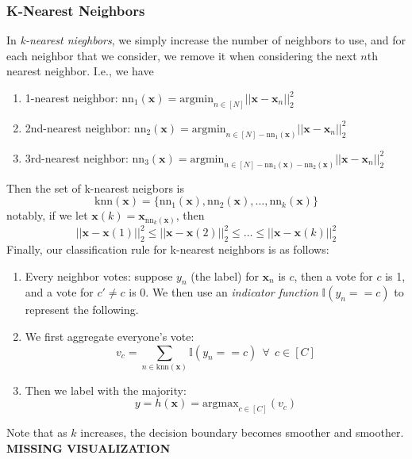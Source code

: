 \documentclass[11 pt]{scrartcl}
\newcommand{\vecx}{\textbf{x}}
\begin{document}
\subsubsection{K-Nearest Neighbors}
\begin{definition}
  In \emph{k-nearest nieghbors}, we simply increase the number of neighbors to use, and for each neighbor that we consider, we remove it when considering the next $n$th nearest neighbor. I.e., we have
\begin{center}
  \begin{enumerate}
    \item 1-nearest neighbor: $\text{nn}_1(\mathbf{x}) = \text{argmin}_{n \in [N]} ||\mathbf{x} - \mathbf{x}_n||_2^2$
    \item 2nd-nearest neighbor: $\text{nn}_2(\mathbf{x}) = \text{argmin}_{n \in [N] - \text{nn}_1(\mathbf{x})} ||\mathbf{x} - \mathbf{x}_n||_2^2$
    \item 3rd-nearest neighbor: $\text{nn}_3(\mathbf{x}) = \text{argmin}_{n \in [N] - \text{nn}_1(\mathbf{x}) - \text{nn}_2(\mathbf{x})} ||\mathbf{x} - \mathbf{x}_n||_2^2$   
  \end{enumerate}
\end{center}
Then the set of k-nearest neigbors is 
$$
\text{knn}(\textbf{x}) = \{\text{nn}_1(\textbf{x}), \text{nn}_2(\textbf{x}), \hdots , \text{nn}_k(\textbf{x})\}
$$
notably, if we let $\textbf{x}(k) = \textbf{x}_{\text{nn}_k(\textbf{x})}$, then
$$
||\vecx - \vecx(1)||_2^2 \leq ||\vecx - \vecx(2)||_2^2 \leq \hdots \leq ||\vecx - \vecx(k)||_2^2
$$
Finally, our classification rule for k-nearest neighbors is as follows:
\begin{center}
\begin{enumerate}
  \item Every neighbor votes: suppose $y_n$ (the label) for $\vecx_n$ is $c$, then a vote for $c$ is 1, and a vote for $c' \neq c$ is 0. We then use an \textit{indicator function} $\mathbb{I}(y_n == c)$ to represent the following.
  \item We first aggregate everyone's vote: 
    $$
    v_c = \sum_{n \in \text{knn}(\textbf{x})} \mathbb{I}(y_n == c) \ \ \forall \ \ c \in [C]
    $$
  \item Then we label with the majority:
    $$
    y = h(\vecx) = \text{argmax}_{c \in [C]}(v_c)
    $$
\end{enumerate}
\end{center}
\end{definition}
Note that as $k$ increases, the decision boundary becomes smoother and smoother. \textbf{MISSING VISUALIZATION}
\end{document}
